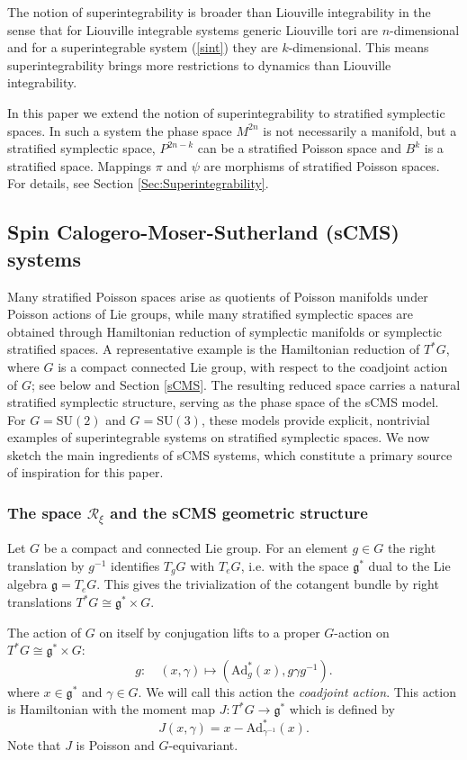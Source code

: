 \documentclass[12pt]{amsart}
\theoremstyle{definition}
\numberwithin{equation}{section}
\newcommand{\SU}{\mathrm{SU}}
\newcommand{\gstar}{\mathfrak{g}^*}
\newcommand{\Reducedxi}{\mathcal{R}_\xi}
\newcommand{\Adjointaction}{\mathrm{Ad}}
\newcommand{\Lieg}{\mathfrak{g}}
\begin{document}
The notion of superintegrability is broader than  Liouville integrability in the sense that for Liouville integrable systems generic Liouville tori are $n$-dimensional and for a superintegrable system (\ref{sint}) they are $k$-dimensional. This means  superintegrability brings more restrictions to dynamics than   Liouville integrability.

In this paper we extend the notion of superintegrability to stratified symplectic spaces. In such a system the phase space $M^{2n}$ is not necessarily a manifold, but a  stratified symplectic space, $P^{2n-k}$ can be a stratified Poisson space and $B^{k}$  is a stratified space. Mappings $\pi$ and $\psi$ are morphisms of stratified Poisson spaces. For details, see Section \ref{Sec:Superintegrability}.




\subsection{Spin Calogero-Moser-Sutherland (sCMS)   systems}\label{Sec:SpinCM}
Many stratified Poisson spaces arise as quotients of Poisson manifolds under Poisson actions of Lie groups, while many stratified symplectic spaces are obtained through Hamiltonian reduction of symplectic manifolds or symplectic stratified spaces. A representative example is the Hamiltonian reduction of \(T^*G\), where \(G\) is a compact connected Lie group, with respect to the coadjoint action of \(G\); see below and Section \ref{sCMS}. The resulting reduced space carries a natural stratified symplectic structure, serving as the phase space of the sCMS model. For \(G=\SU(2)\) and \(G=\SU(3)\), these models provide explicit, nontrivial examples of superintegrable systems on stratified symplectic spaces.  We now  sketch the main ingredients of sCMS systems, which constitute a primary source of inspiration for this paper.
 

\subsubsection{The  space $\Reducedxi$ and the sCMS geometric structure}\label{subSec:phasespaceRxifromG}
Let $G$ be a compact and connected Lie group. 
For an element $g\in G$ the right translation by $g^{-1}$ identifies $T_gG$ with $T_eG$, i.e. with the space $\gstar$ dual to the Lie algebra $\Lieg=T_eG$. This gives the trivialization of the cotangent bundle by right translations $T^*G\cong \gstar\times G$. 

The action of $G$ on itself by conjugation lifts to a proper $G$-action on $T^*G \cong \gstar \times G$:
\[
g\colon\quad (x,\gamma)  \mapsto (\Adjointaction^*_g (x),  g \gamma g^{-1}).
\]
where $x\in \gstar$ and $\gamma\in G$. We will call this action the {\it coadjoint action}. This action is Hamiltonian with the moment map $J: T^*G \to \mathfrak{g}^*$ which is defined by 
\begin{equation}\label{Eqt:JTstarGgeneral}
		J(x, \gamma)=x-{\Adjointaction^*_{\gamma^{-1}}}(x).
\end{equation}
Note that $J$ is Poisson and $G$-equivariant.
\end{document}
